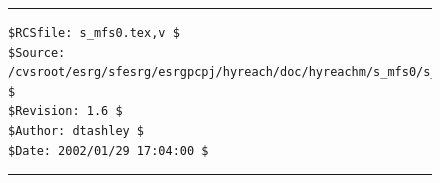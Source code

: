 \noindent\begin{figure}[!b]
\noindent\rule[-0.25in]{\textwidth}{1pt}
\begin{tiny}
\begin{verbatim}
$RCSfile: s_mfs0.tex,v $
$Source: /cvsroot/esrg/sfesrg/esrgpcpj/hyreach/doc/hyreachm/s_mfs0/s_mfs0.tex,v $
$Revision: 1.6 $
$Author: dtashley $
$Date: 2002/01/29 17:04:00 $
\end{verbatim}
\end{tiny}
\noindent\rule[0.25in]{\textwidth}{1pt}
\end{figure}
%
%
%
%
%
%
